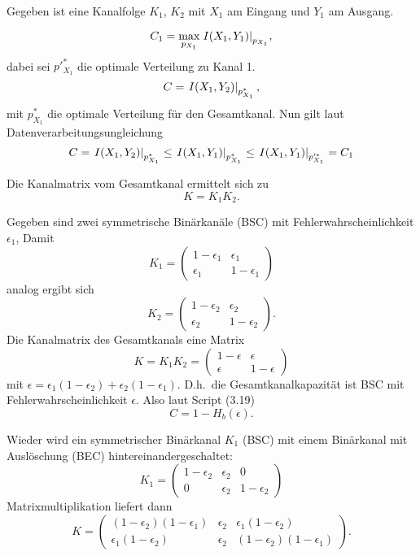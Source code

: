 \documentclass{article}
\begin{document}
\begin{solution}
    Gegeben ist eine Kanalfolge $K_1$, $K_2$ mit $X_1$ am Eingang und $Y_1$ am Ausgang.
    \begin{tasks}
            \item $$C_1=\max_{p_{X_1}}{\left. I(X_1,Y_1)\right\vert_{p_{X_1}}},$$ dabei sei $p'^\ast_{X_1}$ die optimale Verteilung zu Kanal 1.
        $$C=\left. I(X_1,Y_2)\right\vert_{p^\ast_{X_1}},$$ mit $p^\ast_{X_1}$ die optimale Verteilung für den Gesamtkanal.
        Nun gilt laut Datenverarbeitungsungleichung
        $$
        C = \left. I(X_1,Y_2)\right\vert_{p^\ast_{X_1}} \leq \left. I(X_1,Y_1)\right\vert_{p^\ast_{X_1}}\leq \left. I(X_1,Y_1)\right\vert_{p'^\ast_{X_1}}=C_1 
        $$
            \item Die Kanalmatrix vom Gesamtkanal ermittelt sich zu
        $$
        K = K_1 K_2.
        $$
            \item Gegeben sind zwei symmetrische Binärkanäle (BSC) mit Fehlerwahrscheinlichkeit $\epsilon_1$, Damit
        $$
        K_1 =
        \begin{pmatrix}
            1-\epsilon_1 & \epsilon_1\\
            \epsilon_1 & 1-\epsilon_1
        \end{pmatrix}
        $$
        analog ergibt sich
        $$
        K_2 =
        \begin{pmatrix}
            1-\epsilon_2 & \epsilon_2\\
            \epsilon_2 & 1-\epsilon_2
        \end{pmatrix}.
        $$
        Die Kanalmatrix des Gesamtkanals eine Matrix
        $$
        K = K_1 K_2 =
        \begin{pmatrix}
            1-\epsilon & \epsilon\\
            \epsilon & 1-\epsilon
        \end{pmatrix}
        $$
        mit $\epsilon = \epsilon_1(1-\epsilon_2)+\epsilon_2(1-\epsilon_1)$.
        D.h.~die Gesamtkanalkapazität ist BSC mit Fehlerwahrscheinlichkeit $\epsilon$.
        Also laut Script (3.19)
        $$
        C = 1- H_b(\epsilon).
        $$
            \item Wieder wird ein symmetrischer Binärkanal $K_1$ (BSC) mit einem Binärkanal mit Auslöschung (BEC) hintereinandergeschaltet:
        $$
K_1 =
\begin{pmatrix}
    1-\epsilon_2 & \epsilon_2 & 0\\
    0 & \epsilon_2 & 1-\epsilon_2
\end{pmatrix}
$$
Matrixmultiplikation liefert dann
$$
K =
\begin{pmatrix}
    (1-\epsilon_2)(1-\epsilon_1) & \epsilon_2 & \epsilon_1(1-\epsilon_2)\\
     \epsilon_1(1-\epsilon_2) & \epsilon_2 & (1-\epsilon_2)(1-\epsilon_1)
\end{pmatrix}.
$$


\end{tasks}
\end{solution}
\end{document}
